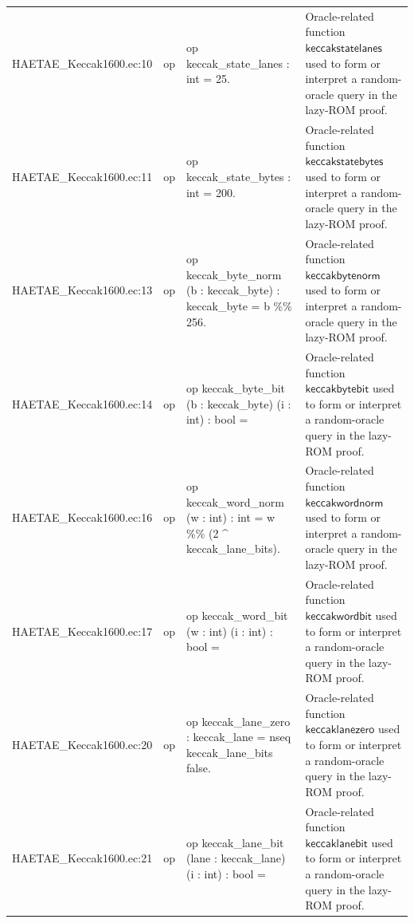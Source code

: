 \documentclass[10pt]{article}
\begin{document}
\begin{longtable}{L{0.11\textwidth}L{0.055\textwidth}L{0.385\textwidth}L{0.41\textwidth}}
HAETAE\_\allowbreak{}Keccak1600.\allowbreak{}ec:\allowbreak{}10 & op & {\ttfamily\scriptsize op keccak\_\allowbreak{}state\_\allowbreak{}lanes : int = 25.} & Oracle-related function $\mathsf{keccakstatelanes}$ used to form or interpret a random-oracle query in the lazy-ROM proof. \\
HAETAE\_\allowbreak{}Keccak1600.\allowbreak{}ec:\allowbreak{}11 & op & {\ttfamily\scriptsize op keccak\_\allowbreak{}state\_\allowbreak{}bytes : int = 200.} & Oracle-related function $\mathsf{keccakstatebytes}$ used to form or interpret a random-oracle query in the lazy-ROM proof. \\
HAETAE\_\allowbreak{}Keccak1600.\allowbreak{}ec:\allowbreak{}13 & op & {\ttfamily\scriptsize op keccak\_\allowbreak{}byte\_\allowbreak{}norm (b : keccak\_\allowbreak{}byte) : keccak\_\allowbreak{}byte = b \%\% 256.} & Oracle-related function $\mathsf{keccakbytenorm}$ used to form or interpret a random-oracle query in the lazy-ROM proof. \\
HAETAE\_\allowbreak{}Keccak1600.\allowbreak{}ec:\allowbreak{}14 & op & {\ttfamily\scriptsize op keccak\_\allowbreak{}byte\_\allowbreak{}bit (b : keccak\_\allowbreak{}byte) (i : int) : bool =} & Oracle-related function $\mathsf{keccakbytebit}$ used to form or interpret a random-oracle query in the lazy-ROM proof. \\
HAETAE\_\allowbreak{}Keccak1600.\allowbreak{}ec:\allowbreak{}16 & op & {\ttfamily\scriptsize op keccak\_\allowbreak{}word\_\allowbreak{}norm (w : int) : int = w \%\% (2 \textasciicircum{} keccak\_\allowbreak{}lane\_\allowbreak{}bits).} & Oracle-related function $\mathsf{keccakwordnorm}$ used to form or interpret a random-oracle query in the lazy-ROM proof. \\
HAETAE\_\allowbreak{}Keccak1600.\allowbreak{}ec:\allowbreak{}17 & op & {\ttfamily\scriptsize op keccak\_\allowbreak{}word\_\allowbreak{}bit (w : int) (i : int) : bool =} & Oracle-related function $\mathsf{keccakwordbit}$ used to form or interpret a random-oracle query in the lazy-ROM proof. \\
HAETAE\_\allowbreak{}Keccak1600.\allowbreak{}ec:\allowbreak{}20 & op & {\ttfamily\scriptsize op keccak\_\allowbreak{}lane\_\allowbreak{}zero : keccak\_\allowbreak{}lane = nseq keccak\_\allowbreak{}lane\_\allowbreak{}bits false.} & Oracle-related function $\mathsf{keccaklanezero}$ used to form or interpret a random-oracle query in the lazy-ROM proof. \\
HAETAE\_\allowbreak{}Keccak1600.\allowbreak{}ec:\allowbreak{}21 & op & {\ttfamily\scriptsize op keccak\_\allowbreak{}lane\_\allowbreak{}bit (lane : keccak\_\allowbreak{}lane) (i : int) : bool =} & Oracle-related function $\mathsf{keccaklanebit}$ used to form or interpret a random-oracle query in the lazy-ROM proof. \\

\end{longtable}
\end{document}
